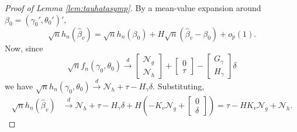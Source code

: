 \begin{proof}[Proof of Lemma \ref{lem:tauhatasymp}]
By a mean-value expansion around $\beta_0 = ( \gamma_0', \theta_0')'$,
\[
  \sqrt{n}h_n\left(\widehat{\beta}_v \right) = \sqrt{n}h_n(\beta_0) + H \sqrt{n} \left(\widehat{\beta}_v - \beta_0\right) + o_p(1).
\]
Now, since
\[
  \sqrt{n}f_n(\gamma_0,\theta_0) \overset{d}{\rightarrow} \left[\begin{array}{c} \mathscr{N}_g\\  \mathscr{N}_h\end{array}\right]+ \left[ \begin{array}{c} 0\\ \tau\end{array}\right] - \left[\begin{array}{c}G_\gamma\\ H_\gamma \end{array}\right]\delta
\]
we have $\sqrt{n}h_n(\gamma_0,\theta_0)\overset{d}{\rightarrow} \mathscr{N}_h + \tau - H_\gamma \delta$.
Substituting, 
	\begin{align*}
		\sqrt{n}h_n(\widehat{\beta}_v) &\overset{d}{\rightarrow}  \mathscr{N}_h + \tau - H_\gamma \delta+ H\left( -K_v \mathscr{N}_g + \left[\begin{array}{c} 0 \\ \delta \end{array} \right]\right)
			= \tau - HK_v \mathscr{N}_g + \mathscr{N}_h.
	\end{align*}
\end{proof}

